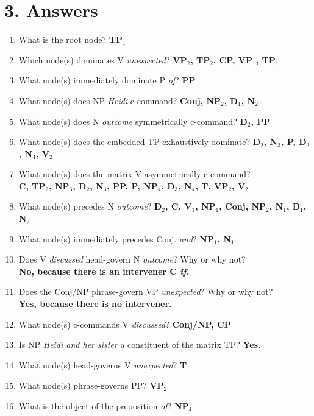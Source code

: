 \documentclass[11pt]{article}
\begin{document}
\section{3. Answers}
\bigskip
\begin{enumerate}
  \setlength{\itemsep}{1.5\itemsep}
  \item [a.] What is the root node? \quad \textbf{TP$_1$}
  \item [b.] Which node(s) dominates V \textit{unexpected}? \quad \textbf{VP$_2$, TP$_2$, CP, VP$_1$, TP$_1$} 
  \item [c.] What node(s) immediately dominate P \textit{of}? \quad \textbf{PP}
  \item [d.] What node(s) does NP \textit{Heidi} c-command? \quad \textbf{Conj, NP$_2$, D$_1$, N$_2$}
  \item [e.] What node(s) does N \textit{outcome} symmetrically c-command? \quad \textbf{D$_2$, PP}
  \item [f.] What node(s) does the embedded TP exhaustively dominate? \quad \textbf{D$_2$, N$_3$, P,  D$_3$, N$_4$, V$_2$}
  \item [g.] What node(s) does the matrix V asymmetrically c-command? \\[0.4em]
  \textbf{C, TP$_2$, NP$_3$, D$_2$, N$_3$, PP, P, NP$_4$, D$_3$, N$_4$, T, VP$_2$, V$_2$}
  \item [h.] What node(s) precedes N \textit{outcome}? \quad \textbf{D$_2$, C, V$_1$, NP$_1$, Conj, NP$_2$, N$_1$, D$_1$, N$_2$}
  \item [i.] What node(s) immediately precedes Conj. \textit{and}? \quad \textbf{NP$_1$, N$_1$}
  \item [j.] Does V \textit{discussed} head-govern N \textit{outcome}? Why or why not? \\[0.4em]
  \textbf{No, because there is an intervener C \textit{if}.}
  \item [k.] Does the Conj/NP phrase-govern VP \textit{unexpected}? Why or why not? \\[0.4em]
  \textbf{Yes, because there is no intervener.}
  \item [l.] What node(s) c-commands V \textit{discussed}? \quad \textbf{Conj/NP, CP}
  \item [m.] Is NP \textit{Heidi and her sister} a constituent of the matrix TP? \quad \textbf{Yes.}
  \item [n.] What node(s) head-governs V \textit{unexpected}? \quad \textbf{T}
  \item [o.] What node(s) phrase-governs PP? \quad \textbf{VP$_2$}
  \item [p.] What is the object of the preposition \textit{of}? \quad \textbf{NP$_4$}
\end{enumerate}
\end{document}
